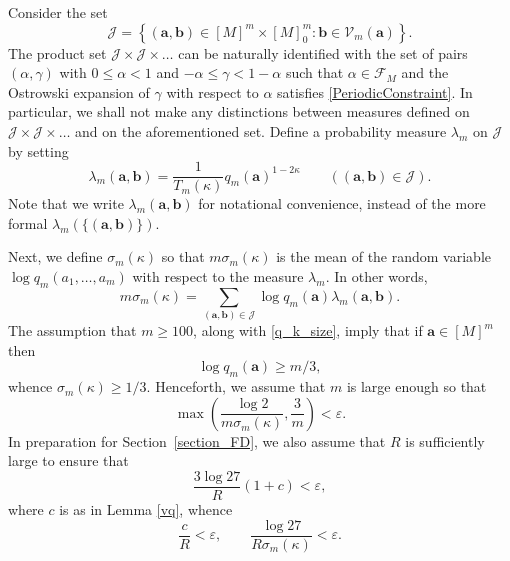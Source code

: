\documentclass[12pt, reqno]{amsart}
\theoremstyle{definition}
\theoremstyle{remark}
\numberwithin{equation}{section}
\def\alp{{\alpha}} \def\bfalp{{\boldsymbol \alpha}}
\def\kap{{\kappa}}
\def\lam{{\lambda}} \def\Lam{{\Lambda}} \def\Lamtil{{\widetilde \Lambda}}
\def\sig{{\sigma}} \def\Sig{{\Sigma}} \def\bfsig{{\boldsymbol \sig}}
\def\eps{\varepsilon}
\def\le{\leqslant} \def\ge{\geqslant}
\def\geq{\geqslant}
\def \sig{{\sigma}}
\def \ba {\mathbf a}
\def \bb {\mathbf b}
\def \cF {\mathcal F}
\def \cJ {\mathcal J}
\def \cV {\mathcal V}
\begin{document}
Consider the set 
\[ 
\cJ = \left\{ (\ba,\bb) \in [M]^m \times [M]_0^m : \bb \in \cV_m(\ba) \right\}. 
\]
The product set $\cJ\times \cJ \times \ldots $ can be naturally identified with the set of pairs $(\alp, \gamma)$ with $0 \le \alp < 1$ and $-\alp \le \gamma < 1-\alp $ such that $\alp \in \cF_M$ and the Ostrowski expansion of $\gamma$ with respect to $\alp$ satisfies 
\eqref{PeriodicConstraint}. 
In particular, we shall not make any distinctions between measures defined on $\cJ \times \cJ \times \ldots$ and on the aforementioned set.
Define a probability measure $\lambda_m$ on $\cJ$ by setting 
\begin{equation} \label{def_lambda_m}
\lam_m(\ba,\bb) = \frac{1}{T_m(\kap)}q_m(\ba)^{1-2\kap} \qquad 
((\ba, \bb) \in \cJ).
\end{equation}
Note that we write $\lam_m(\ba,\bb)$ for notational convenience, instead of the more formal 
$\lam_m(\{ (\ba, \bb)\}).$

Next, we define $\sig_m(\kap)$ so that $m \sig_m(\kap)$ is the mean of the random variable $\log q_m(a_1,\ldots,a_m)$ with respect to the measure $\lam_m$. In other words, 
\[ 
m \sig_m(\kap) = \sum_{(\ba,\bb) \in \cJ} \log q_m(\ba) \lambda_m(\ba,\bb). 
\]
The assumption that $m \geq 100$, along with \eqref{q_k_size}, imply that if $\mathbf{a}\in [M]^m$ then
\[
\log q_m(\mathbf{a})\geq m/3,
\]
whence $\sigma_m(\kap) \geq 1/3$. Henceforth, we assume that $m$ is large enough so that
\begin{equation} \label{m_conditions}   \max \left(\frac{\log 2}{m\sigma_m(\kap)   }, \frac{3}{m} \right) < \varepsilon. 
\end{equation}
In preparation for Section~\ref{section_FD}, we also assume that $R$ is sufficiently large to ensure that
\[
\frac{3 \log 27}{R} (1+c)
< \eps,
\]
where $c$ is as in Lemma \ref{vq},
whence
\begin{equation} \label{R_is_large}
\frac{c}{R} < \eps,
\qquad
\frac{\log 27}{ R\sigma_m(\kappa)} <\varepsilon.
\end{equation}
\end{document}
